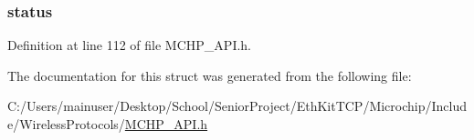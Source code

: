 \subsubsection[{status}]{ status}\label{struct_____c_o_n_n_e_c_t_i_o_n___e_n_t_r_y_a211425c904d6e6c235104591e0490149}


Definition at line 112 of file M\+C\+H\+P\+\_\+\+A\+P\+I.\+h.



The documentation for this struct was generated from the following file\+:\begin{DoxyCompactItemize}
\item 
C\+:/\+Users/mainuser/\+Desktop/\+School/\+Senior\+Project/\+Eth\+Kit\+T\+C\+P/\+Microchip/\+Include/\+Wireless\+Protocols/\hyperlink{_m_c_h_p___a_p_i_8h}{M\+C\+H\+P\+\_\+\+A\+P\+I.\+h}\end{DoxyCompactItemize}
